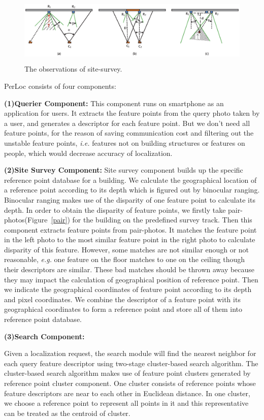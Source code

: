 \documentclass[10pt, conference, letterpaper]{IEEEtran}
\def\ie{\textit{i.e.}\xspace}
\def\eg{\textit{e.g.}\xspace}
\def\oursystem{\xspace{PerLoc}\xspace}
\begin{document}
\begin{figure}[!htpb]
\centering
\includegraphics[width=1\linewidth,height=1.3in]{site-survey2.eps}
\caption{The observations of site-survey.}\label{fig_site-survey}
\end{figure}

\oursystem consists of four components:


\textbf{(1)Querier Component:}
This component runs on smartphone as an application for users. It extracts the feature points from the query photo taken by a user, and generates a descriptor for each feature point. But we don't need all feature points, for the reason of saving communication cost and filtering out the unstable feature points, \ie features not on building structures or features on people, which would decrease accuracy of localization.

\textbf{(2)Site Survey Component:}
Site survey component builds up the specific reference point database for a building. We calculate the geographical location of a reference point according to its depth which is figured out by binocular ranging. Binocular ranging makes use of the disparity of one feature point to calculate its depth. In order to obtain the disparity of feature points, we firstly take pair-photos(Figure~\ref{pair}) for the building on the predefined survey track. Then this component extracts feature points from pair-photos. It matches the feature point in the left photo to the most similar feature point in the right photo to calculate disparity of this feature. However, some matches are not similar enough or not reasonable, \eg one feature on the floor matches to one on the ceiling though their descriptors are similar. These bad matches should be thrown away because they may impact the calculation of geographical position of reference point. Then we indicate the geographical coordinates of feature point according to its depth and pixel coordinates. We combine the descriptor of a feature point with its geographical coordinates to form a reference point and store all of them into reference point database.

\textbf{(3)Search Component:}

Given a localization request, the search module will find the nearest neighbor for each query feature descriptor using two-stage cluster-based search algorithm. The cluster-based search algorithm makes use of feature point clusters generated by reference point cluster component. One cluster consists of reference points whose feature descriptors are near to each other in Euclidean distance. In one cluster, we choose a reference point to represent all points in it and this representative can be treated as the centroid of cluster.
\end{document}
